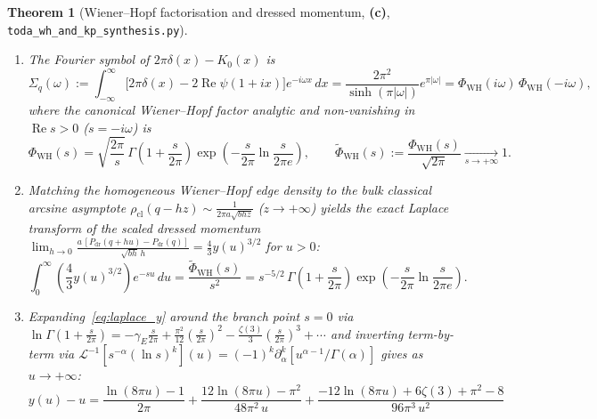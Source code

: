 \documentclass[11pt,a4paper]{article}
\newcommand{\Lc}{\textsf{\textbf{(c)}}}
\newcommand{\scrshort}{\texttt{toda\_\allowbreak wh\_\allowbreak and\_\allowbreak kp\_\allowbreak synthesis.py}}
\newtheorem{theorem}{Theorem}[section]
\theoremstyle{remark}
\begin{document}
\begin{theorem}[Wiener--Hopf factorisation and dressed momentum, \Lc, \scrshort]\label{thm:wh_du}
\begin{enumerate}
\item The Fourier symbol of $2\pi\delta(x) - K_0(x)$ is
  \begin{equation}\label{eq:wh_symbol}
    \Sigma_q(\omega) := \int_{-\infty}^\infty \big[2\pi\delta(x) - 2\operatorname{Re}\psi(1+ix)\big] e^{-i\omega x}\,dx
    = \frac{2\pi^2}{\sinh(\pi|\omega|)}e^{\pi|\omega|}
    = \Phi_{\mathrm{WH}}(i\omega)\,\Phi_{\mathrm{WH}}(-i\omega),
  \end{equation}
  where the canonical Wiener--Hopf factor analytic and non-vanishing in $\operatorname{Re} s > 0$ ($s = -i\omega$) is
  \begin{equation}\label{eq:phi_wh}
    \Phi_{\mathrm{WH}}(s) = \sqrt{\frac{2\pi}{s}}\,\Gamma\!\left(1 + \frac{s}{2\pi}\right)
    \exp\!\left(-\frac{s}{2\pi}\ln\frac{s}{2\pi e}\right), \qquad
    \widetilde{\Phi}_{\mathrm{WH}}(s) := \frac{\Phi_{\mathrm{WH}}(s)}{\sqrt{2\pi}} \underset{s\to+\infty}{\longrightarrow} 1.
  \end{equation}
\item Matching the homogeneous Wiener--Hopf edge density to the bulk classical arcsine asymptote
  $\rho_{\mathrm{cl}}(q - hz) \sim \frac{1}{2\pi a\sqrt{bhz}}$ ($z\to+\infty$) yields the exact
  Laplace transform of the scaled dressed momentum
  $\lim_{h\to 0} \frac{a\,[P_{\mathrm{dr}}(q+hu)-P_{\mathrm{dr}}(q)]}{\sqrt{bh}\,h} = \frac{4}{3}y(u)^{3/2}$
  for $u > 0$:
  \begin{equation}\label{eq:laplace_y}
    \int_0^\infty \left(\frac{4}{3}y(u)^{3/2}\right) e^{-su}\,du
    = \frac{\widetilde{\Phi}_{\mathrm{WH}}(s)}{s^2}
    = s^{-5/2}\,\Gamma\!\left(1 + \frac{s}{2\pi}\right)\exp\!\left(-\frac{s}{2\pi}\ln\frac{s}{2\pi e}\right).
  \end{equation}
\item Expanding~\eqref{eq:laplace_y} around the branch point $s = 0$ via
  $\ln\Gamma(1+\frac{s}{2\pi}) = -\gamma_E\frac{s}{2\pi} + \frac{\pi^2}{12}(\frac{s}{2\pi})^2 - \frac{\zeta(3)}{3}(\frac{s}{2\pi})^3 + \cdots$
  and inverting term-by-term via $\mathcal{L}^{-1}[s^{-\alpha}(\ln s)^k](u) = (-1)^k\partial_\alpha^k[u^{\alpha-1}/\Gamma(\alpha)]$
  gives as $u\to+\infty$:
  \begin{equation}\label{eq:y_of_u}
    y(u) - u = \frac{\ln(8\pi u) - 1}{2\pi}
    + \frac{12\ln(8\pi u) - \pi^2}{48\pi^2\,u}
    + \frac{-12\ln(8\pi u) + 6\zeta(3) + \pi^2 - 8}{96\pi^3\,u^2}

\end{equation}
\end{enumerate}
\end{theorem}
\end{document}
